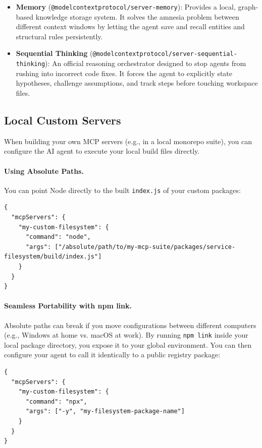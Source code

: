 \begin{itemize}
    \item \textbf{Memory} (\lstinline[style=inline]|@modelcontextprotocol/server-memory|): Provides a local, graph-based knowledge storage system. It solves the amnesia problem between different context windows by letting the agent save and recall entities and structural rules persistently.
    \item \textbf{Sequential Thinking} (\lstinline[style=inline]|@modelcontextprotocol/server-sequential-thinking|): An official reasoning orchestrator designed to stop agents from rushing into incorrect code fixes. It forces the agent to explicitly state hypotheses, challenge assumptions, and track steps before touching workspace files.
\end{itemize}

\subsection{Local Custom Servers}
When building your own MCP servers (e.g., in a local monorepo suite), you can configure the AI agent to execute your local build files directly.

\paragraph{Using Absolute Paths.}
You can point Node directly to the built \lstinline[style=inline]|index.js| of your custom packages:

\begin{lstlisting}[style=json]
{
  "mcpServers": {
    "my-custom-filesystem": {
      "command": "node",
      "args": ["/absolute/path/to/my-mcp-suite/packages/service-filesystem/build/index.js"]
    }
  }
}
\end{lstlisting}

\paragraph{Seamless Portability with npm link.}
Absolute paths can break if you move configurations between different computers (e.g., Windows at home vs. macOS at work). By running \lstinline[style=inline]|npm link| inside your local package directory, you expose it to your global environment. You can then configure your agent to call it identically to a public registry package:

\begin{lstlisting}[style=json]
{
  "mcpServers": {
    "my-custom-filesystem": {
      "command": "npx",
      "args": ["-y", "my-filesystem-package-name"]
    }
  }
}
\end{lstlisting}

